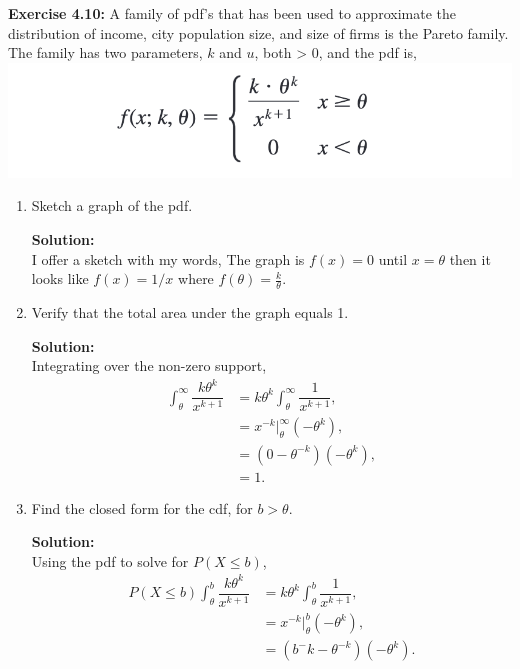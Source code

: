 \documentclass[12pt]{article}
\theoremstyle{homework}
\newcommand{\localhead}[1]{\par\smallskip\noindent\textbf{#1}\nobreak\\}%
\newcommand\solution{\localhead{Solution:}}
\begin{document}
\hspace{.5in}\textbf{Exercise 4.10:} A  family  of  pdf’s  that  has  been  used  to  approximate 
 the  distribution  of  income,  city  population  size,  and  size  of 
 firms is the Pareto family. The family has two parameters, $k$ and $u$, both > 0, and the pdf is,
 \center
 \includegraphics[width = \textwidth]{pdf1.png}
 \center
 \begin{enumerate}
   
   
   \item Sketch a graph of the pdf.\\
   
\solution I offer a sketch with my words, 
The graph is $f(x) = 0$ until $x = \theta$ then it looks like $f(x) = 1/x$ where $f(\theta) = \frac{k}{\theta}$. 
\vspace{.25in}


\item Verify that the total area under the graph equals 1.\\

\solution Integrating over the non-zero support,
\begin{align*}
  \int_{\theta}^{\infty} \dfrac{k\theta^k}{x^{k+1}} &=  k\theta^k \int_{\theta}^{\infty} \dfrac{1}{x^{k+1}}, \\
  &= x^{-k}|_\theta^{\infty}(-\theta^k), \\
  &=(0 - \theta^{-k}) (-\theta^k),\\
  &= 1.  
\end{align*}

\vspace{.25in}


\item Find the closed form for the cdf, for $b > \theta$.\\

\solution Using the pdf to solve for $P(X \le b)$,
\begin{align*}
  P(X \le b)\int_{\theta}^{b} \dfrac{k\theta^k}{x^{k+1}} &= k\theta^k \int_{\theta}^{b} \dfrac{1}{x^{k+1}},\\
  &= x^{-k}|_\theta^{b}(-\theta^k),\\
  &=(b^-k - \theta^{-k}) (-\theta^k).
\end{align*}


\end{enumerate}
\end{document}
